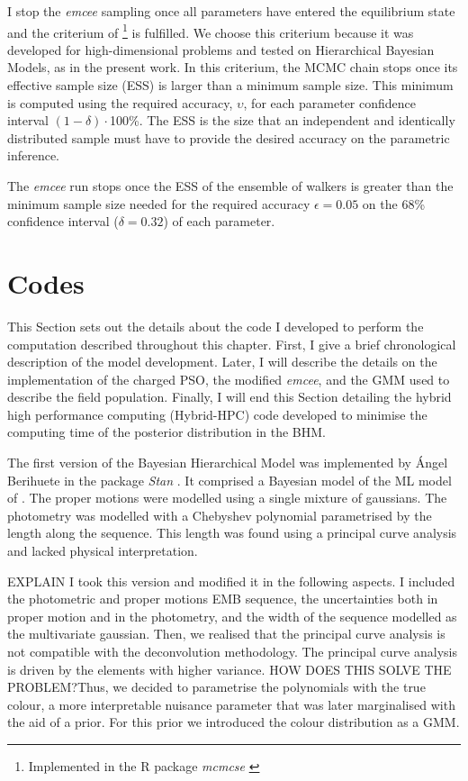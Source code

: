 I stop the \emph{emcee} sampling once all parameters have entered the equilibrium state and the criterium of \citet{Gong2016} \footnote{Implemented in the R package \emph{mcmcse} \citep{mcmcse}} is fulfilled. We choose this criterium because it was developed for high-dimensional problems and tested on Hierarchical Bayesian Models, as in the present work. In this criterium, the MCMC chain stops once its effective sample size (ESS) is larger than a minimum sample size. This minimum is computed using the required accuracy, $\upsilon$, for each parameter confidence interval $(1-\delta)\cdot$100\%. The ESS is the size that an independent and identically distributed sample must have to provide the desired accuracy on the parametric inference. 

The \emph{emcee} run stops once the ESS of the ensemble of walkers is greater than the minimum sample size needed for the required accuracy $\epsilon = 0.05$ on the 68\% confidence interval ($\delta = 0.32$) of each parameter.


\section{Codes}
\label{sect:code}
This Section sets out the details about the code I developed to perform the computation described throughout this chapter. First, I give a brief chronological description of the model development. Later, I will describe the details on the implementation of the charged PSO, the modified \emph{emcee}, and the GMM used to describe the field population. Finally, I will end this Section detailing the hybrid high performance computing (Hybrid-HPC) code developed to minimise the computing time of the posterior distribution in the BHM.

The first version of the Bayesian Hierarchical Model was implemented by \'Angel Berihuete in the package \emph{Stan} \citep{Stan}. It comprised a Bayesian model of the ML model of \citet{Sarro2014}. The proper motions were modelled using a single mixture of gaussians. The photometry was modelled with a Chebyshev polynomial parametrised by the length along the sequence. This length was found using a principal curve analysis and lacked physical interpretation.

{\color{red}EXPLAIN
I took this version and modified it in the following aspects. I included the photometric and proper motions EMB sequence, the uncertainties both in proper motion and in the photometry, and the width of the sequence modelled as the multivariate gaussian. Then, we realised that the principal curve analysis is not compatible with the deconvolution methodology. The principal curve analysis is driven by the elements with higher variance. HOW DOES THIS SOLVE THE PROBLEM?Thus, we decided to parametrise the polynomials with the true colour, a more interpretable nuisance parameter that was later marginalised with the aid of a prior. For this prior we introduced the colour distribution as a GMM. }

